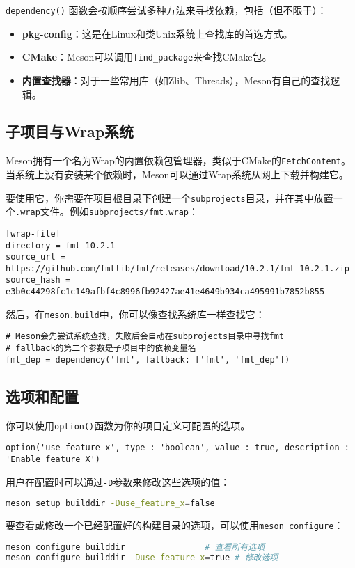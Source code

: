 \documentclass[../main.tex]{subfiles}
\begin{document}
\texttt{dependency()} 函数会按顺序尝试多种方法来寻找依赖，包括（但不限于）：
\begin{itemize}
  \item \textbf{pkg-config}：这是在Linux和类Unix系统上查找库的首选方式。
  \item \textbf{CMake}：Meson可以调用\texttt{find\_package}来查找CMake包。
  \item \textbf{内置查找器}：对于一些常用库（如Zlib、Threads），Meson有自己的查找逻辑。
\end{itemize}

\subsection{子项目与Wrap系统}
Meson拥有一个名为Wrap的内置依赖包管理器，类似于CMake的\texttt{FetchContent}。当系统上没有安装某个依赖时，Meson可以通过Wrap系统从网上下载并构建它。

要使用它，你需要在项目根目录下创建一个\texttt{subprojects}目录，并在其中放置一个\texttt{.wrap}文件。例如\texttt{subprojects/fmt.wrap}：
\begin{lstlisting}
[wrap-file]
directory = fmt-10.2.1
source_url = https://github.com/fmtlib/fmt/releases/download/10.2.1/fmt-10.2.1.zip
source_hash = e3b0c44298fc1c149afbf4c8996fb92427ae41e4649b934ca495991b7852b855
\end{lstlisting}
然后，在\texttt{meson.build}中，你可以像查找系统库一样查找它：
\begin{lstlisting}
# Meson会先尝试系统查找，失败后会自动在subprojects目录中寻找fmt
# fallback的第二个参数是子项目中的依赖变量名
fmt_dep = dependency('fmt', fallback: ['fmt', 'fmt_dep'])
\end{lstlisting}

\subsection{选项和配置}
你可以使用\texttt{option()}函数为你的项目定义可配置的选项。
\begin{lstlisting}
option('use_feature_x', type : 'boolean', value : true, description : 'Enable feature X')
\end{lstlisting}
用户在配置时可以通过\texttt{-D}参数来修改这些选项的值：
\begin{lstlisting}[language=bash]
meson setup builddir -Duse_feature_x=false
\end{lstlisting}
要查看或修改一个已经配置好的构建目录的选项，可以使用\texttt{meson configure}：
\begin{lstlisting}[language=bash]
meson configure builddir                # 查看所有选项
meson configure builddir -Duse_feature_x=true # 修改选项
\end{lstlisting}
\end{document}
